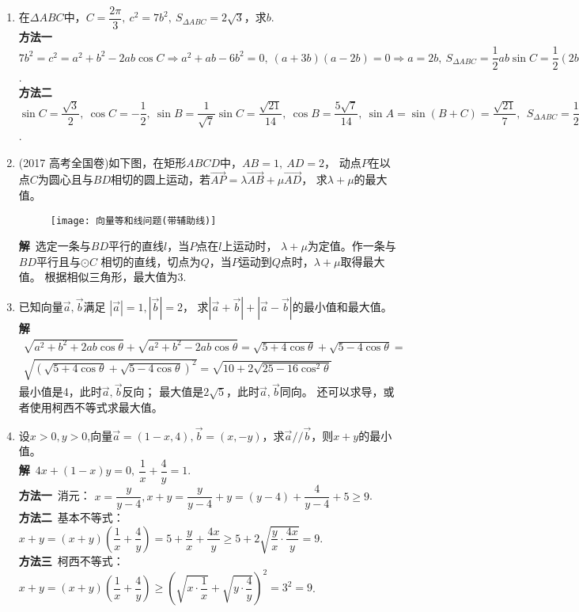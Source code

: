 \begin{enumerate}[label={【\textbf{例\thechapter.\arabic*}】},
 leftmargin=\inteval{\myenumleftmargin}pt,
 itemsep=\inteval{\myenumitempsep}pt,
 itemindent=\inteval{\myenumitemindent}pt]
\item 在$ \Delta ABC $中，$ C=\dfrac{2\pi}{3},\ c^2=7b^2,\ S_{\Delta ABC}=
2\sqrt{3} $，求$ b $. \\
\textbf{方法一}\ $ 7b^2=c^2=a^2+b^2-2ab\cos C \Rightarrow a^2+ab-6b^2=0,\ (a+3b)
(a-2b)=0\Rightarrow a=2b,\ S_{\Delta ABC}=\dfrac{1}{2}ab\sin C=\dfrac{1}{2}(2b)b\dfrac{\sqrt{3}}{2}=2\sqrt{3},\ b=2  $. \\
\textbf{方法二}\ $ \sin C=\dfrac{\sqrt{3}}{2},\ \cos C=-\dfrac{1}{2},\ \sin B=
\dfrac{1}{\sqrt{7}}\sin C=\dfrac{\sqrt{21}}{14},\ \cos B=\dfrac{5\sqrt{7}}{14},
\ \sin A=\sin(B+C)=\dfrac{\sqrt{21}}{7},\ \ S_{\Delta ABC}=\dfrac{1}{2}bc\sin A=
\dfrac{1}{2}b(\sqrt{7}b)\dfrac{\sqrt{21}}{7}=2\sqrt{3},\ b=2 $. 

\item (2017 高考全国卷)如下图，在矩形$ ABCD $中，$ AB=1,\ AD=2 $，
动点$ P $在以点$ C $为圆心且与$ BD $相切的圆上运动，若$ \vec{AP}=
\lambda\vec{AB}+\mu\vec{AD} $，
求$ \lambda+\mu $的最大值。 
\begin{figure}[H]
    \centering
    \texttt{[image: 向量等和线问题(带辅助线)]}
\end{figure} 
\noindent\textbf{解}\ 选定一条与$ BD $平行的直线$ l $，当$ P $点在$ l $上运动时，
$ \lambda+\mu $为定值。作一条与$ BD $平行且与$ \odot C $
相切的直线，切点为$ Q $，当$ P $运动到$ Q $点时，$ \lambda+\mu $取得最大值。
根据相似三角形，最大值为3. 

\item 已知向量$ \vec{a},\vec{b} $满足
$ |\vec{a}|=1,|\vec{b}|=2$，
求$ |\vec{a}+\vec{b}|+|\vec{a}-
\vec{b}| $的最小值和最大值。\\
\textbf{解}\ 
\begin{gather*}
    \sqrt{a^2+b^2+2ab\cos\theta}+\sqrt{a^2+b^2-2ab\cos\theta}=
    \sqrt{5+4\cos\theta}+\sqrt{5-4\cos\theta}=\\
    \sqrt{\left(\sqrt{5+4\cos\theta}+\sqrt{5-4\cos\theta} 
        \right)^2}=\sqrt{10+2\sqrt{25-16\cos^2\theta}}
\end{gather*}
最小值是4，此时$ \vec{a},\vec{b} $反向；
最大值是$ 2\sqrt{5} $，此时$ \vec{a},\vec{b} $同向。
还可以求导，或者使用柯西不等式求最大值。

\item 设$ x>0,y>0 $,向量$ \vec{a}=(1-x,4),\vec{b}=
(x,-y) $，求$ \vec{a}//\vec{b} $，则$ x+y $的最小值。\\
\textbf{解}\ $ 4x+(1-x)y=0,\ \dfrac{1}{x}+\dfrac{4}{y}=1 $. \\
\textbf{方法一}\ 消元：
$ x=\dfrac{y}{y-4},x+y=\dfrac{y}{y-4}+y=(y-4)+\dfrac{4}{y-4}+5\geq 9 $. \\
\textbf{方法二}\ 基本不等式：
$ x+y=(x+y)(\dfrac{1}{x}+\dfrac{4}{y})=5+\dfrac{y}{x}+\dfrac{4x}{y}
\geq 5+ 2\sqrt{\dfrac{y}{x}\cdot \dfrac{4x}{y}}=9 $. \\
\textbf{方法三}\ 柯西不等式：$ x+y=(x+y)(\dfrac{1}{x}+\dfrac{4}{y})
\geq \left( \sqrt{x\cdot \dfrac{1}{x}}+
\sqrt{y\cdot \dfrac{4}{y}}\right) ^2=3^2=9 $. 


\end{enumerate}
